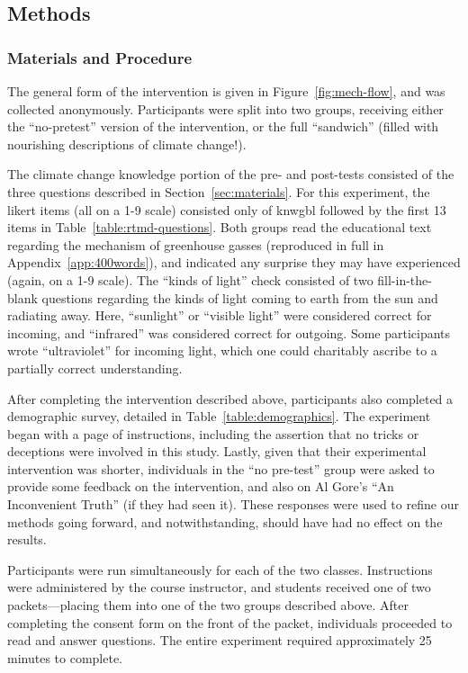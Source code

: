 \subsection{Methods}

\subsubsection{Materials and Procedure}

The general form of the intervention is given in Figure~\ref{fig:mech-flow}, and
was collected anonymously.  Participants were split into two groups, receiving
either the “no-pretest” version of the intervention, or the full “sandwich”
(filled with nourishing descriptions of climate change!). 

The climate change knowledge portion of the pre- and post-tests consisted of the
three questions described in Section~\ref{sec:materials}. For this experiment,
the likert items (all on a 1-9 scale) consisted only of \textsf{knwgbl} followed
by the first 13 items in Table~\ref{table:rtmd-questions}. Both groups read the
educational text regarding the mechanism of greenhouse gasses (reproduced in
full in Appendix~\ref{app:400words}), and indicated any surprise they may have
experienced (again, on a 1-9 scale). The “kinds of light” check consisted of two
fill-in-the-blank questions regarding the kinds of light coming to earth from
the sun and radiating away. Here, “sunlight” or “visible light” were considered
correct for incoming, and “infrared” was considered correct for outgoing.  Some
participants wrote “ultraviolet” for incoming light, which one could charitably
ascribe to a partially correct understanding.

After completing the intervention described above, participants also
completed a demographic survey, detailed in Table~\ref{table:demographics}.
The experiment began with a page of instructions, including the assertion that
no tricks or deceptions were involved in this study. Lastly, given that their
experimental intervention was shorter, individuals in the “no pre-test” group
were asked to provide some feedback on the intervention, and also on Al Gore’s
“An Inconvenient Truth” (if they had seen it). These responses were used to
refine our methods going forward, and \textcite{bem-future} notwithstanding,
should have had no effect on the results.

Participants were run simultaneously for each of the two classes. Instructions
were administered by the course instructor, and students received one of two
packets---placing them into one of the two groups described above. After
completing the consent form on the front of the packet, individuals proceeded to
read and answer questions. The entire experiment required approximately
25 minutes to complete.

